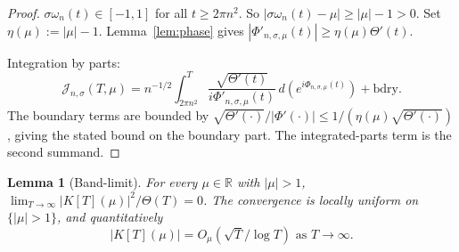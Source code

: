 \documentclass[11pt,a4paper]{article}
\theoremstyle{plain}
\newtheorem{lemma}[theorem]{Lemma}
\theoremstyle{definition}
\theoremstyle{remark}
\newcommand{\R}{\mathbb{R}}
\begin{document}
\begin{proof}
$\sigma\omega_n(t)\in[-1,1]$ for all $t\ge 2\pi n^2$. So $|\sigma\omega_n(t)-\mu|\ge|\mu|-1>0$. Set $\eta(\mu):=|\mu|-1$. Lemma~\ref{lem:phase} gives $|\Phi'_{n,\sigma,\mu}(t)|\ge\eta(\mu)\Theta'(t)$.

Integration by parts:
\[
\mathcal J_{n,\sigma}(T,\mu)=n^{-1/2}\int_{2\pi n^2}^T\frac{\sqrt{\Theta'(t)}}{i\Phi'_{n,\sigma,\mu}(t)}\,d(e^{i\Phi_{n,\sigma,\mu}(t)})+\text{bdry}.
\]
The boundary terms are bounded by $\sqrt{\Theta'(\cdot)}/|\Phi'(\cdot)|\le 1/(\eta(\mu)\sqrt{\Theta'(\cdot)})$, giving the stated bound on the boundary part. The integrated-parts term is the second summand.
\end{proof}

\begin{lemma}[Band-limit]\label{lem:band}
For every $\mu\in\R$ with $|\mu|>1$, $\lim_{T\to\infty}|K[T](\mu)|^2/\Theta(T)=0$. The convergence is locally uniform on $\{|\mu|>1\}$, and quantitatively
\[
|K[T](\mu)|=O_\mu(\sqrt{T}/\log T)\text{ as }T\to\infty.
\]
\end{lemma}
\end{document}
